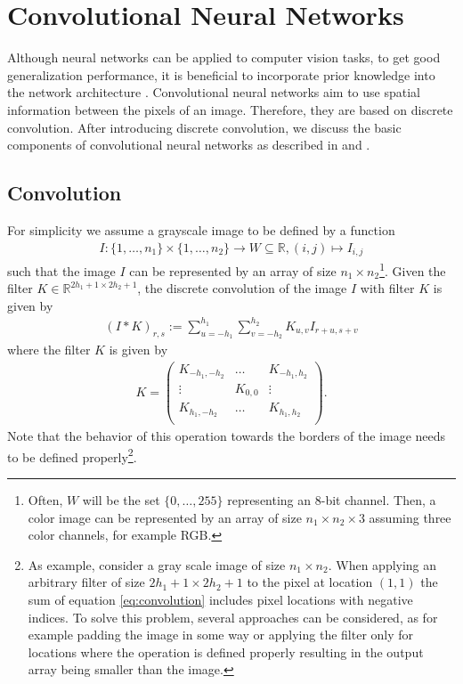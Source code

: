\section{Convolutional Neural Networks}
\label{sec:convolutional-neural-networks}

Although neural networks can be applied to computer vision tasks, to get good generalization performance, it is beneficial to incorporate prior knowledge into the network architecture \cite{LeCun:1989}. Convolutional neural networks aim to use spatial information between the pixels of an image. Therefore, they are based on discrete convolution. After introducing discrete convolution, we discuss the basic components of convolutional neural networks as described in \cite{JarrettKavukcuogluRanzatoLeCun:2009} and \cite{LeCunKavukvuogluFarabet:2010}.

\subsection{Convolution}
\label{subsec:convolution}

For simplicity we assume a grayscale image to be defined by a function
\begin{align}
	I : \{1, \ldots, n_1\} \times \{1, \ldots, n_2\} \rightarrow W \subseteq \mathbb{R}, (i,j) \mapsto I_{i,j}
\end{align}
such that the image $I$ can be represented by an array of size $n_1 \times n_2$\footnote{Often, $W$ will be the set $\{0, \ldots, 255\}$ representing an $8$-bit channel. Then, a color image can be represented by an array of size $n_1 \times n_2 \times 3$ assuming three color channels, for example RGB.}. Given the filter $K \in \mathbb{R}^{2h_1+1 \times 2h_2+1}$, the discrete convolution of the image $I$ with filter $K$ is given by
\begin{align}
	\label{eq:convolution}
	\left(I \ast K\right)_{r,s} := \sum _{u = -h_1} ^{h_1} \sum _{v = -h_2}^{h_2} K_{u,v} I_{r+u,s+v}
\end{align}
where the filter $K$ is given by
\begin{align}
	K =
 	\begin{pmatrix}
  		K_{-h_1,-h_2} & \ldots & K_{-h_1,h_2}\\
  		\vdots & K_{0,0} & \vdots\\
  		K_{h_1,-h_2} & \ldots & K_{h_1,h_2}\\
 	\end{pmatrix}.
\end{align}
Note that the behavior of this operation towards the borders of the image needs to be defined properly\footnote{As example, consider a gray scale image of size $n_1 \times n_2$. When applying an arbitrary filter of size $2h_1+1 \times 2h_2+1$ to the pixel at location $(1,1)$ the sum of equation \eqref{eq:convolution} includes pixel locations with negative indices. To solve this problem, several approaches can be considered, as for example padding the image in some way or applying the filter only for locations where the operation is defined properly resulting in the output array being smaller than the image.}.


